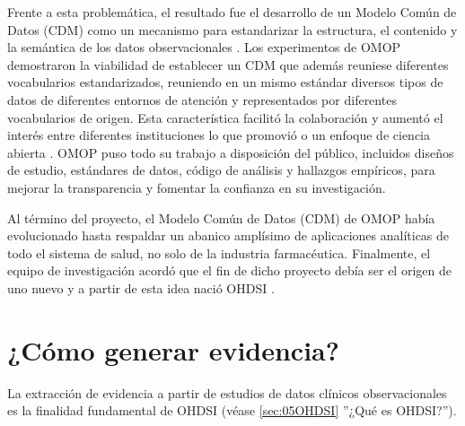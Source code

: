 Frente a esta problemática, el resultado fue el desarrollo de un Modelo Común de Datos (CDM) como un mecanismo para estandarizar la estructura, el contenido y la semántica de los datos observacionales %
\cite{overhage2012validation}. Los experimentos de OMOP demostraron la viabilidad de establecer un CDM que además reuniese diferentes vocabularios estandarizados, reuniendo en un mismo estándar diversos tipos de datos de diferentes entornos de atención y representados por diferentes vocabularios de origen. Esta característica facilitó la colaboración y aumentó el interés entre diferentes instituciones lo que promovió o un enfoque de ciencia abierta \cite{OHDSIbook}. OMOP puso todo su trabajo a disposición del público, incluidos diseños de estudio, estándares de datos, código de análisis y hallazgos empíricos, para mejorar la transparencia y fomentar la confianza en su investigación. 

Al término del proyecto, el Modelo Común de Datos (CDM) de OMOP había evolucionado hasta respaldar un abanico  amplísimo de aplicaciones analíticas de todo el sistema de salud, no solo de la industria farmacéutica. Finalmente, el equipo de investigación acordó que el fin de dicho proyecto debía ser el origen de uno nuevo y a partir de esta idea nació OHDSI \cite{OHDSIbook}.


\section{¿Cómo generar evidencia?} \label{sec:05Evidencia}

La extracción de evidencia a partir de estudios de datos clínicos observacionales es la finalidad fundamental de OHDSI (véase \ref{sec:05OHDSI} ''¿Qué es OHDSI?''). 



